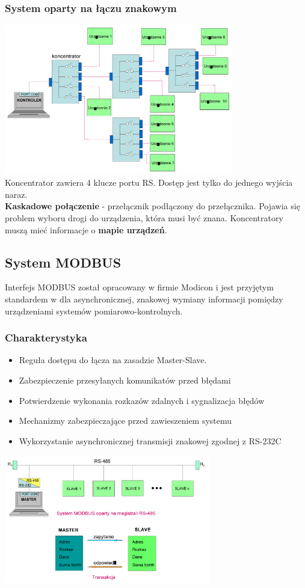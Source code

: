 \documentclass[a4paper,twoside]{article}
\begin{document}
		\subsubsection{System oparty na łączu znakowym}
		\includegraphics[width=10cm]{./wyklady/RS232_15_1.pdf}\\
		Koncentrator zawiera 4 klucze portu RS. Dostęp jest tylko do jednego wyjścia naraz.\\
		\textbf{Kaskadowe połączenie} - przełącznik podłączony do przełącznika. Pojawia się problem wyboru drogi do urządzenia, która musi być znana. Koncentratory muszą mieć informacje o \textbf{mapie urządzeń}.
	\subsection{System MODBUS}
		Interfejs MODBUS został opracowany w firmie Modicon i jest przyjętym standardem w dla asynchronicznej, znakowej wymiany informacji pomiędzy urządzeniami systemów pomiarowo-kontrolnych.
		\subsubsection{Charakterystyka}
			\begin{itemize}
				\item Reguła dostępu do łącza na zasadzie Master-Slave. 
				\item Zabezpieczenie przesyłanych komunikatów przed błędami
				\item Potwierdzenie wykonania rozkazów zdalnych i sygnalizacja błędów
				\item Mechanizmy zabezpieczające przed zawieszeniem systemu
				\item Wykorzystanie asynchronicznej transmisji znakowej zgodnej z RS-232C
			\end{itemize}
		\includegraphics[width=9cm]{./wyklady/RS232_16_1.pdf}\\
\end{document}
